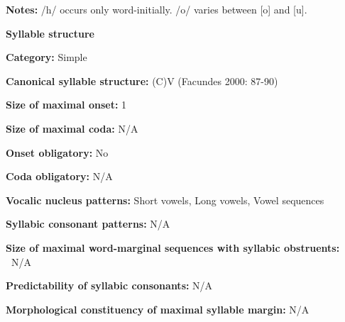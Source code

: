 \begin{styleBody}
\textbf{Notes:} /h/ occurs only word-initially. /o/ varies between [o] and [u]. 
\end{styleBody}

\begin{styleBody}
\textbf{Syllable structure}
\end{styleBody}

\begin{styleBody}
\textbf{Category:} Simple
\end{styleBody}

\begin{styleBody}
\textbf{Canonical syllable structure: }(C)V (Facundes 2000: 87-90)
\end{styleBody}

\begin{styleBody}
\textbf{Size of maximal onset:} 1
\end{styleBody}

\begin{styleBody}
\textbf{Size of maximal coda:} N/A
\end{styleBody}

\begin{styleBody}
\textbf{Onset obligatory:} No
\end{styleBody}

\begin{styleBody}
\textbf{Coda obligatory:} N/A
\end{styleBody}

\begin{styleBody}
\textbf{Vocalic nucleus patterns:} Short vowels, Long vowels, Vowel sequences
\end{styleBody}

\begin{styleBody}
\textbf{Syllabic consonant patterns:} N/A
\end{styleBody}

\begin{styleBody}
\textbf{Size of maximal word{}-marginal sequences with syllabic obstruents:} \textbf{\ }N/A
\end{styleBody}

\begin{styleBody}
\textbf{Predictability of syllabic consonants:} N/A
\end{styleBody}

\begin{styleBody}
\textbf{Morphological constituency of maximal syllable margin:} N/A
\end{styleBody}

